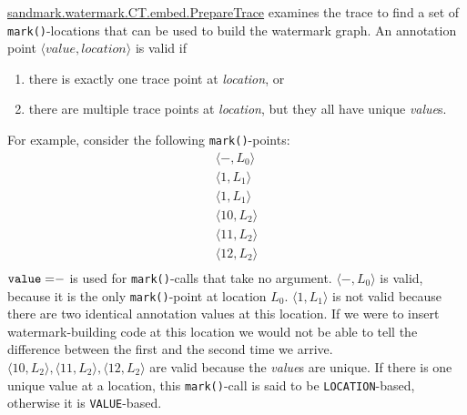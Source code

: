\url{sandmark.watermark.CT.embed.PrepareTrace} examines
the trace to find a set of {\tt mark()}-locations that
can be used to build the watermark graph.
An annotation point $\langle\mathit{value},\mathit{location}\rangle$
is valid if
\begin{enumerate}
      \item there is exactly one trace point at {\em location}, or
      \item there are multiple trace points at {\em location},
            but they all have unique {\em value}s.
\end{enumerate}
For example, consider the following {\tt mark()}-points:
$$
\begin{array}{l}
\langle -,L_0\rangle \\
\langle 1,L_1\rangle \\
\langle 1,L_1\rangle \\
\langle 10,L_2\rangle \\
\langle 11,L_2\rangle \\
\langle 12,L_2\rangle \\
\end{array}
$$
${\tt value=}-$ is used for {\tt mark()}-calls that take no argument.
$\langle -,L_0\rangle$ is valid, because it is the only
{\tt mark()}-point at location $L_0$.
$\langle 1,L_1\rangle$ is not valid because there are
two identical annotation values at this location. If
we were to insert watermark-building code at this
location we would not be able to tell the difference
between the first and the second time we arrive.
$\langle 10,L_2\rangle, \langle 11,L_2\rangle, \langle 12,L_2\rangle$
are valid because the {\em value}s are unique. If there is
one unique value at a location, this {\tt mark()}-call is
said to be {\tt LOCATION}-based, otherwise it is {\tt VALUE}-based.


